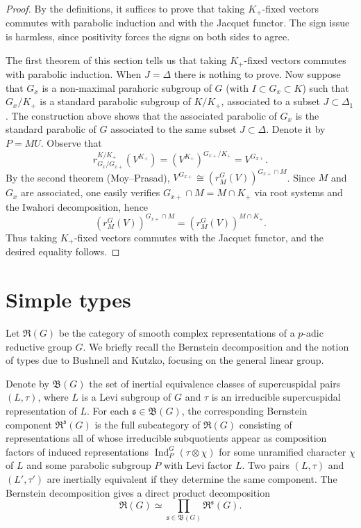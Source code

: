 \documentclass[12pt]{article}
\theoremstyle{remark}
\begin{document}
\begin{proof}
By the definitions, it suffices to prove that taking $K_+$-fixed vectors commutes with parabolic induction and with the Jacquet functor. The sign issue is harmless, since positivity forces the signs on both sides to agree.

The first theorem of this section tells us that taking $K_+$-fixed vectors commutes with parabolic induction. When $J=\Delta$ there is nothing to prove. Now suppose that $G_x$ is a non-maximal parahoric subgroup of $G$ (with $I \subset G_x \subset K$) such that $G_x/K_+$ is a standard parabolic subgroup of $K/K_+$, associated to a subset $J \subset \Delta_1$. The construction above shows that the associated parabolic of $G_x$ is the standard parabolic of $G$ associated to the same subset $J \subset \Delta$. Denote it by $P=MU$. Observe that
$$r_{G_x/G_{x+}}^{K/K_+}(V^{K_+}) = (V^{K_+})^{G_{x+}/K_+} = V^{G_{x+}}.$$
By the second theorem (Moy--Prasad), $V^{G_{x+}} \cong (r_{M}^{G}(V))^{G_{x+} \cap M}$. Since $M$ and $G_x$ are associated, one easily verifies $G_{x+} \cap M = M \cap K_+$ via root systems and the Iwahori decomposition, hence
$$(r_{M}^{G}(V))^{G_{x+} \cap M} = (r_{M}^{G}(V))^{M \cap K_+}.$$
Thus taking $K_+$-fixed vectors commutes with the Jacquet functor, and the desired equality follows.
\end{proof}

\section{Simple types}
Let $\mathfrak{R}(G)$ be the category of smooth complex representations of a $p$-adic reductive group $G$. We briefly recall the Bernstein decomposition and the notion of types due to Bushnell and Kutzko, focusing on the general linear group.

Denote by $\mathfrak{B}(G)$ the set of inertial equivalence classes of supercuspidal pairs $(L,\tau)$, where $L$ is a Levi subgroup of $G$ and $\tau$ is an irreducible supercuspidal representation of $L$. For each $\mathfrak{s} \in \mathfrak{B}(G)$, the corresponding Bernstein component $\mathfrak{R}^{\mathfrak{s}}(G)$ is the full subcategory of $\mathfrak{R}(G)$ consisting of representations all of whose irreducible subquotients appear as composition factors of induced representations $\operatorname{Ind}_P^G(\tau \otimes \chi)$ for some unramified character $\chi$ of $L$ and some parabolic subgroup $P$ with Levi factor $L$. Two pairs $(L,\tau)$ and $(L',\tau')$ are inertially equivalent if they determine the same component. The Bernstein decomposition gives a direct product decomposition
$$
\mathfrak{R}(G) \simeq \prod_{\mathfrak{s} \in \mathfrak{B}(G)} \mathfrak{R}^{\mathfrak{s}}(G).
$$
\end{document}
